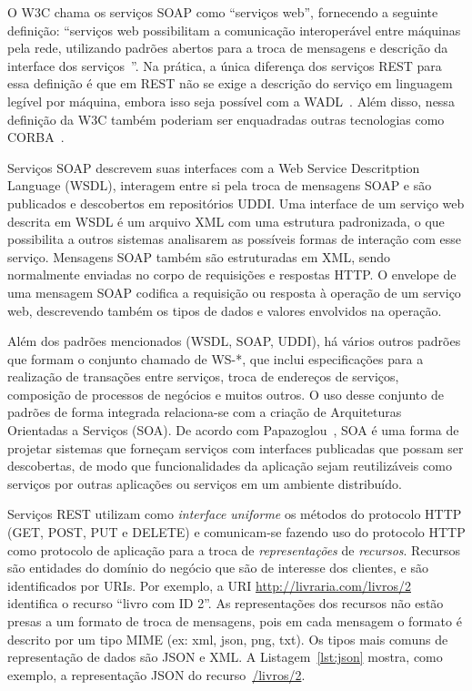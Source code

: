 O W3C chama os serviços SOAP como ``serviços web'', fornecendo a seguinte definição: ``serviços web possibilitam a comunicação interoperável entre máquinas pela rede, utilizando padrões abertos para a troca de mensagens e descrição da interface dos serviços~\cite{W3C2004WS}''. Na prática, a única diferença dos serviços REST para essa definição é que em REST não se exige a descrição do serviço em linguagem legível por máquina, embora isso seja possível com a WADL~\cite{WADL2006}. Além disso, nessa definição da W3C também poderiam ser enquadradas outras tecnologias como CORBA~\cite{CORBA1995}. 

Serviços SOAP descrevem suas interfaces com a Web Service Descritption Language (WSDL), interagem entre si pela troca de mensagens SOAP e são publicados e descobertos em repositórios UDDI. Uma interface de um serviço web descrita em WSDL é um arquivo XML com uma estrutura padronizada, o que possibilita a outros sistemas analisarem as possíveis formas de interação com esse serviço. Mensagens SOAP também são estruturadas em XML, sendo normalmente enviadas no corpo de requisições e respostas HTTP. O envelope de uma mensagem SOAP codifica a requisição ou resposta à operação de um serviço web, descrevendo também os tipos de dados e valores envolvidos na operação. 

Além dos padrões mencionados (WSDL, SOAP, UDDI), há vários outros padrões que formam o conjunto chamado de WS-*, que inclui especificações para a realização de transações entre serviços, troca de endereços de serviços, composição de processos de negócios e muitos outros. O uso desse conjunto de padrões de forma integrada relaciona-se com a criação de Arquiteturas Orientadas a Serviços (SOA). De acordo com Papazoglou~\cite{Papazoglou2007State}, SOA é uma forma de projetar sistemas que forneçam serviços com interfaces publicadas que possam ser descobertas, de modo que funcionalidades da aplicação sejam reutilizáveis como serviços por outras aplicações ou serviços em um ambiente distribuído. 

Serviços REST utilizam como \emph{interface uniforme} os métodos do protocolo HTTP (GET, POST, PUT e DELETE) e comunicam-se fazendo uso do protocolo HTTP como protocolo de aplicação para a troca de \emph{representações} de \emph{recursos}. 
Recursos são entidades do domínio do negócio que são de interesse dos clientes, e são identificados por URIs. Por exemplo, a URI \url{http://livraria.com/livros/2} identifica o recurso ``livro com ID 2''. 
As representações dos recursos não estão presas a um formato de troca de mensagens, pois em cada mensagem o formato é descrito por um tipo MIME (ex: xml, json, png, txt). Os tipos mais comuns de representação de dados são JSON e XML. A Listagem~\ref{lst:json} mostra, como exemplo, a representação JSON do recurso~\url{/livros/2}.

